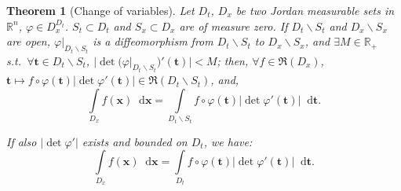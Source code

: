 \documentclass[openany]{book}
\theoremstyle{plain}
\newtheorem{theorem}{Theorem}[section] %
\theoremstyle{definition}
\newcommand{\dif}{\mathop{}\!\mathrm{d}} %
\newcommand*{\bv}{\boldsymbol} %
\begin{document}
\begin{theorem}[Change of variables]
	Let $D_t$, $D_x$ be two Jordan measurable sets in $\mathbb R^n$, $\varphi \in D_x^{D_t}$. 
	$S_t \subset D_t$ and $S_x \subset D_x$ are of measure zero.
	If $D_t \backslash S_t$ and $D_x \backslash S_x$ are open, $\varphi|_{D_t \backslash S_t}$ is a diffeomorphism from $D_t \backslash S_t$ to $D_x \backslash S_x$, and $\exists M \in \mathbb R_+$ s.t.\ $\forall \bv t \in D_t \backslash S_t$, $|\det (\varphi|_{D_t \backslash S_t})'(\bv t)| < M$; 
	then, $\forall f \in \mathfrak R(D_x)$, $\bv t \mapsto f \circ \varphi(\bv t) |\det \varphi'(\bv t)| \in \mathfrak R(D_t \backslash S_t)$, and, 
	\begin{equation*}
		\int\limits_{D_x} f(\bv x) \dif \bv x = \int\limits_{D_t\backslash S_t} f \circ \varphi(\bv t) |\det \varphi'(\bv t)| \dif \bv t.
	\end{equation*}

	If also $|\det \varphi'|$ exists and bounded on $D_t$, we have:
	\begin{equation*}
		\int\limits_{D_x} f(\bv x) \dif \bv x = \int\limits_{D_t} f \circ \varphi(\bv t) |\det \varphi'(\bv t)| \dif \bv t.
	\end{equation*}
\end{theorem}
\end{document}
